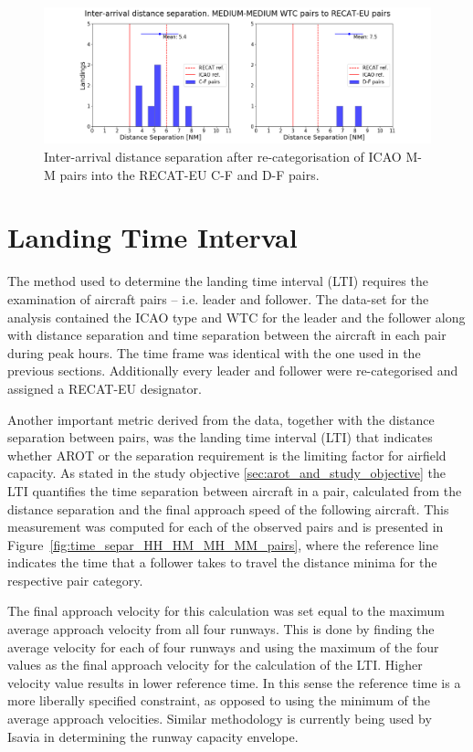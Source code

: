 \begin{figure}[h]
    \centering
    \includegraphics[width=1\textwidth]{graphics/fig_MM_to_CF_and_DF_pairs_dist_separ.png}
    \caption[Inter-arrival distance separation of ICAO M-M pairs into the RECAT-EU C-F and D-F pairs]{Inter-arrival distance separation after re-categorisation of ICAO M-M pairs into the RECAT-EU C-F and D-F pairs.}
    \label{fig:MM_to_CF_and_DF_pairs_dist_separ}
\end{figure}




\section{Landing Time Interval}\label{sec:LTI}
The method used to determine the landing time interval (LTI) requires the examination of aircraft pairs -- i.e. leader and follower. The data-set for the analysis contained the ICAO type and WTC for the leader and the follower along with distance separation and time separation between the aircraft in each pair during peak hours. The time frame was identical with the one used in the previous sections. Additionally every leader and follower were re-categorised and assigned a RECAT-EU designator.


Another important metric derived from the data, together with the distance separation between pairs, was the landing time interval (LTI) that indicates whether AROT or the separation requirement is the limiting factor for airfield capacity. As stated in the study objective \ref{sec:arot_and_study_objective} the LTI quantifies the time separation between aircraft in a pair, calculated from the distance separation and the final approach speed of the following aircraft. This measurement was computed for each of the observed pairs and is presented in Figure~\ref{fig:time_separ_HH_HM_MH_MM_pairs}, where the reference line indicates the time that a follower takes to travel the distance minima for the respective pair category. 

The final approach velocity for this calculation was set equal to the maximum average approach velocity from all four runways. This is done by finding the average velocity for each of four runways and using the maximum of the four values as the final approach velocity for the calculation of the LTI. Higher velocity value results in lower reference time. In this sense the reference time is a more liberally specified constraint, as opposed to using the minimum of the average approach velocities. Similar methodology is currently being used by Isavia in determining the runway capacity envelope.

